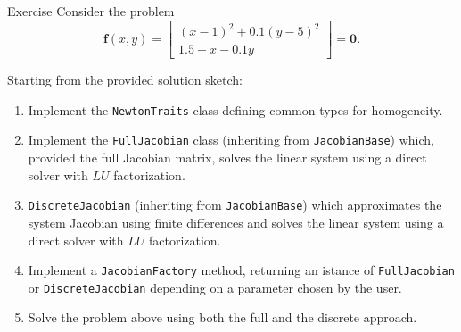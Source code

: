 \documentclass[10pt]{beamer}
\begin{document}
\begin{frame}{Exercise}
	Consider the problem
	\[
	\mathbf{f}(x, y) =
	\begin{bmatrix}
		(x-1)^2 + 0.1(y - 5)^2 \\
		1.5 -x - 0.1y
	\end{bmatrix}
	=
	\mathbf{0}.
	\]
	
	Starting from the provided solution sketch:
	\begin{enumerate}
		\item Implement the \texttt{NewtonTraits} class defining common types for homogeneity.
		\item Implement the \texttt{FullJacobian} class (inheriting from \texttt{JacobianBase}) which, provided the full Jacobian matrix, solves the linear system using a direct solver with \(LU\) factorization.
		\item \texttt{DiscreteJacobian} (inheriting from \texttt{JacobianBase}) which approximates the system Jacobian using finite differences and solves the linear system using a direct solver with \(LU\) factorization.
		\item Implement a \texttt{JacobianFactory} method, returning an istance of \texttt{FullJacobian} or \texttt{DiscreteJacobian} depending on a parameter chosen by the user.
		\item Solve the problem above using both the full and the discrete approach.
	\end{enumerate}
\end{frame}
\end{document}
